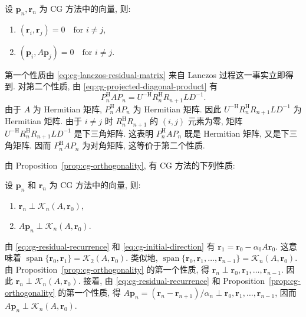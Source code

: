 \begin{Proposition}\label{prop:cg-orthogonality}
{设 $\bm p_n,\bm r_n$ 为 CG 方法中的向量, 则:}
\begin{enumerate}\item $(\bm r_i,\bm r_j)=0\quad\text{for }i\ne j$,\item $(\bm p_i,A\bm p_j)=0\quad\text{for }i\ne j$.\end{enumerate}
\end{Proposition}
\begin{Proof}
{第一个性质由 \eqref{eq:cg-lanczos-residual-matrix} 来自 Lanczos 过程这一事实立即得到. 对第二个性质, 由 \eqref{eq:cg-projected-diagonal-product} 有}
\[P_n^{\mathrm H}AP_n=U^{-\mathrm H}R_n^{\mathrm H}R_{n+1}LD^{-1}.\]
{由于 $A$ 为 Hermitian 矩阵, $P_n^{\mathrm H}AP_n$ 为 Hermitian 矩阵. 因此 $U^{-\mathrm H}R_n^{\mathrm H}R_{n+1}LD^{-1}$ 为 Hermitian 矩阵. 由于 $i\ne j$ 时 $R_n^{\mathrm H}R_{n+1}$ 的 $(i,j)$ 元素为零, 矩阵 $U^{-\mathrm H}R_n^{\mathrm H}R_{n+1}LD^{-1}$ 是下三角矩阵. 这表明 $P_n^{\mathrm H}AP_n$ 既是 Hermitian 矩阵, 又是下三角矩阵. 因而 $P_n^{\mathrm H}AP_n$ 为对角矩阵, 这等价于第二个性质.}
\end{Proof}
{由 Proposition\ \ref{prop:cg-orthogonality}, 有 CG 方法的下列性质:}
\begin{Corollary}\label{cor:cg-krylov-orthogonality}
{设 $\bm p_n$ 和 $\bm r_n$ 为 CG 方法中的向量, 则:}
\begin{enumerate}\item $\bm r_n\perp\mathcal K_n(A,\bm r_0)$,\item $A\bm p_n\perp\mathcal K_n(A,\bm r_0)$.\end{enumerate}
\end{Corollary}
\begin{Proof}
{由 \eqref{eq:cg-residual-recurrence} 和 \eqref{eq:cg-initial-direction} 有 $\bm r_1=\bm r_0-\alpha_0A\bm r_0$. 这意味着 $\operatorname{span}\{\bm r_0,\bm r_1\}=\mathcal K_2(A,\bm r_0)$. 类似地, $\operatorname{span}\{\bm r_0,\bm r_1,\ldots,\bm r_{n-1}\}=\mathcal K_n(A,\bm r_0)$. 由 Proposition\ \ref{prop:cg-orthogonality} 的第一个性质, 得 $\bm r_n\perp\bm r_0,\bm r_1,\ldots,\bm r_{n-1}$. 因此 $\bm r_n\perp\mathcal K_n(A,\bm r_0)$. 接着, 由 \eqref{eq:cg-residual-recurrence} 和 Proposition\ \ref{prop:cg-orthogonality} 的第一个性质, 得 $A\bm p_n=(\bm r_n-\bm r_{n+1})/\alpha_n\perp\bm r_0,\bm r_1,\ldots,\bm r_{n-1}$, 因而 $A\bm p_n\perp\mathcal K_n(A,\bm r_0)$.}
\end{Proof}
